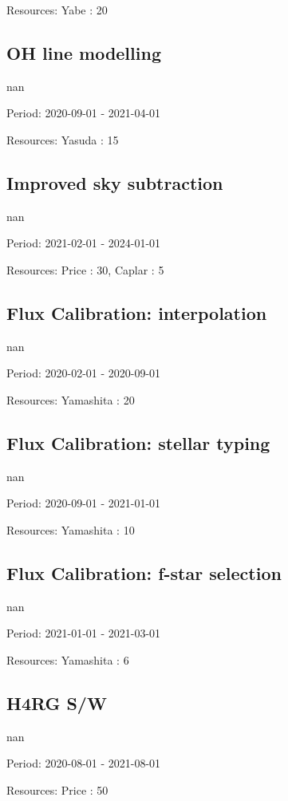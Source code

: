 Resources: Yabe : 20

\subsection{OH line modelling}

nan

Period: 2020-09-01 - 2021-04-01

Resources: Yasuda : 15

\subsection{Improved sky subtraction}

nan

Period: 2021-02-01 - 2024-01-01

Resources: Price : 30, Caplar : 5

\subsection{Flux Calibration: interpolation}

nan

Period: 2020-02-01 - 2020-09-01

Resources: Yamashita : 20

\subsection{Flux Calibration: stellar typing}

nan

Period: 2020-09-01 - 2021-01-01

Resources: Yamashita : 10

\subsection{Flux Calibration: f-star selection}

nan

Period: 2021-01-01 - 2021-03-01

Resources: Yamashita : 6

\subsection{H4RG S/W}

nan

Period: 2020-08-01 - 2021-08-01

Resources: Price : 50

